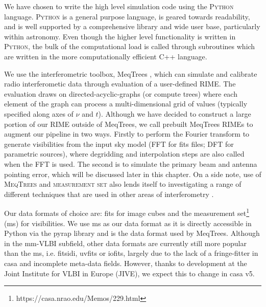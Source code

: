 We have chosen to write the high level simulation code using the \textsc{Python} language. \textsc{Python} is a general purpose language, is geared towards readability, and is well supported by a comprehensive library and wide user base, particularly within astronomy. Even though the higher level functionality is written in \textsc{Python}, the bulk of the computational load is called through subroutines which are written in the more computationally efficient {\sc C++} language.


We use the interferometric toolbox, {\sc MeqTrees} \citep{Noordam_2010}, which can simulate and calibrate radio interferometic data through evaluation of a user-defined RIME. The evaluation draws on directed-acyclic-graphs (or compute trees) where each element of the graph can process a multi-dimensional grid of values (typically specified along axes of $\nu$ and $t$).
Although we have decided to construct a large portion of our RIME outside of {\sc MeqTrees}, we call prebuilt {\sc MeqTrees} RIMEs to augment our pipeline in two ways. Firstly to perform the Fourier transform  to generate visibilities from the input sky model (FFT for fits files; DFT for parametric sources), where degridding and interpolation steps are also called when the FFT is used. The second is to simulate the primary beam and antenna pointing error, which will be discussed later in this chapter. On a side note, use of \textsc{MeqTrees} and \textsc{measurement set} also lends itself to investigating a range of different techniques that are used in other areas of interferometry \citep*[e.g.][]{Smirnov_2015}.


Our data formats of choice are: {\sc fits} for image cubes and the {\sc measurement set}\footnote{https://casa.nrao.edu/Memos/229.html} ({\sc ms}) for visibilities. We use {\sc ms} as our data format as it is directly accessible in {\sc Python} via the {\sc pyrap} library and is the data format used by {\sc MeqTrees}. Although in the mm-VLBI subfield, other data formats are currently still more popular than the {\sc ms}, i.e. {\sc fitsidi}, {\sc uvfits} or {\sc iofits}, largely due to the lack of a fringe-fitter in {\sc casa} and incomplete meta-data fields. However,  thanks to development at the Joint Institute for VLBI in Europe (JIVE), we expect this to change in {\sc casa v5}. 


